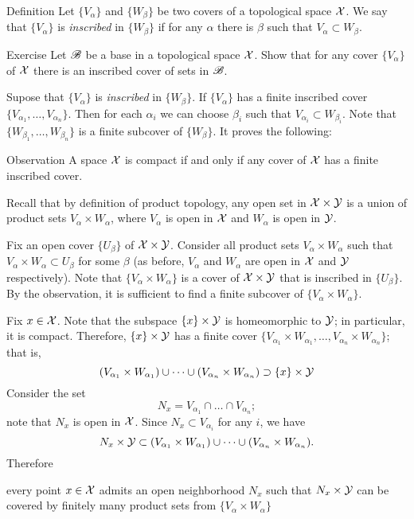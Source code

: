 \begin{thm}{Definition}
Let $\{V_\alpha\}$ and $\{W_\beta\}$ be two covers of a topological space $\mathcal{X}$.
We say that $\{V_\alpha\}$ is \emph{inscribed} in $\{W_\beta\}$ if for any $\alpha$ there is $\beta$ such that $V_\alpha\subset W_\beta$.
\end{thm}

\begin{thm}{Exercise}
Let $\mathscr{B}$ be a base in a topological space $\mathcal{X}$.
Show that for any cover $\{V_\alpha\}$ of $\mathcal{X}$ there is an inscribed cover of sets in $\mathscr{B}$.
\end{thm}

Supose that $\{V_\alpha\}$ is \emph{inscribed} in $\{W_\beta\}$.
If $\{V_\alpha\}$ has a finite inscribed cover $\{V_{\alpha_1},\dots,V_{\alpha_n}\}$.
Then for each $\alpha_i$ we can choose $\beta_i$ such that $V_{\alpha_i}\subset  W_{\beta_i}$.
Note that $\{W_{\beta_1},\dots,W_{\beta_n}\}$ is a finite subcover of $\{W_\beta\}$.
It proves the following:

\begin{thm}{Observation}\label{obs:inscribed-cover}
A space $\mathcal{X}$ is compact if and only if any cover of $\mathcal{X}$ has a finite inscribed cover. 
\end{thm}

Recall that by definition of product topology, any open set in $\mathcal{X}\times\mathcal{Y}$ is a union of product sets 
$V_\alpha\times W_\alpha$, where $V_\alpha$ is open in $\mathcal{X}$ and $W_\alpha$ is open in $\mathcal{Y}$.

Fix an open cover $\{U_\beta\}$ of $\mathcal{X}\times\mathcal{Y}$.
Consider all product sets $V_\alpha\times W_\alpha$ such that $V_\alpha\times W_\alpha\subset U_\beta$ for some $\beta$ (as before, $V_\alpha$ and $W_\alpha$ are open in $\mathcal{X}$ and $\mathcal{Y}$ respectively).
Note that $\{V_\alpha\times W_\alpha\}$ is a cover of $\mathcal{X}\times\mathcal{Y}$ that is inscribed in $\{U_\beta\}$.
By the observation, it is sufficient to find a finite subcover of $\{V_\alpha\times W_\alpha\}$.

Fix $x \in \mathcal{X}$.
Note that the subspace $\{x\}\times \mathcal{Y}$ is homeomorphic to $\mathcal{Y}$;
in particular, it is compact.
Therefore, $\{x\}\times \mathcal{Y}$ has a finite cover $\{V_{\alpha_1}\times W_{\alpha_1},\dots,V_{\alpha_n}\times W_{\alpha_n}\}$; that is,
\[(V_{\alpha_1}\times W_{\alpha_1})\cup\dots\cup
(V_{\alpha_n}\times W_{\alpha_n})
\supset \{x\}\times \mathcal{Y}\]
Consider the set
\[N_x=V_{\alpha_1}\cap\dots\cap V_{\alpha_n};\]
note that $N_x$ is  open in $\mathcal{X}$.
Since $N_x\subset V_{\alpha_i}$ for any $i$, we have
\[N_x\times \mathcal{Y}\subset (V_{\alpha_1}\times W_{\alpha_1})\cup\dots\cup
(V_{\alpha_n}\times W_{\alpha_n}).\]
Therefore
\begin{clm}{}\label{clm:Nx}
every point $x\in\mathcal{X}$ admits an open neighborhood $N_x$ such that $N_x\times \mathcal{Y}$ can be covered by finitely many product sets from $\{V_\alpha\times W_\alpha\}$
\end{clm}


